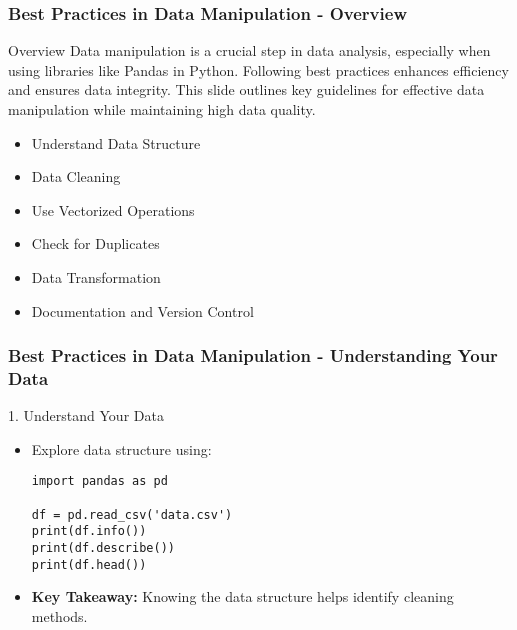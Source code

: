 \documentclass[aspectratio=169]{beamer}
\begin{document}
\begin{frame}[fragile]
  \frametitle{Best Practices in Data Manipulation - Overview}
  
  \begin{block}{Overview}
  Data manipulation is a crucial step in data analysis, especially when using libraries like Pandas in Python. Following best practices enhances efficiency and ensures data integrity. This slide outlines key guidelines for effective data manipulation while maintaining high data quality.
  \end{block}
  
  \begin{itemize}
      \item Understand Data Structure
      \item Data Cleaning
      \item Use Vectorized Operations
      \item Check for Duplicates
      \item Data Transformation
      \item Documentation and Version Control
  \end{itemize}
  
\end{frame}

\begin{frame}[fragile]
  \frametitle{Best Practices in Data Manipulation - Understanding Your Data}
  
  \begin{block}{1. Understand Your Data}
      \begin{itemize}
          \item Explore data structure using:
          \begin{lstlisting}
import pandas as pd

df = pd.read_csv('data.csv')
print(df.info())
print(df.describe())
print(df.head())
          \end{lstlisting}
          \item \textbf{Key Takeaway:} Knowing the data structure helps identify cleaning methods.
      \end{itemize}
  \end{block}
  
\end{frame}
\end{document}
